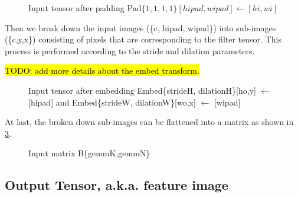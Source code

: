 {}
\begin{figure}[!h]
  \centering
  \caption{Input tensor after padding $\text{Pad}\{1,1,1,1\}[hipad,wipad] \leftarrow [hi,wi]$}
  \label{fig:input_pad_tensor}
\end{figure}

Then we break down the input images (\{c, hipad, wipad\}) into sub-images (\{c,y,x\}) consisting of pixels
that are corresponding to the filter tensor.
This process is performed according to the stride and dilation parameters.

\hl{TODO: add more details about the embed transform.}

\begin{figure}[!h]
  \centering
  \caption{Input tensor after embedding Embed\{strideH, dilationH\}[ho,y] $\leftarrow$ [hipad] and Embed\{strideW, dilationW\}[wo,x] $\leftarrow$ [wipad]}
  \label{fig:input_embed_tensor}
\end{figure}


At last, the broken down sub-images can be flattened into a matrix as shown in
\Fig \ref{fig:input_matrix_B}.
{}
\begin{figure}[!h]
  \centering
  \caption{Input matrix B\{gemmK,gemmN\}}
  \label{fig:input_matrix_B}
\end{figure}


\subsection{Output Tensor, a.k.a.  feature image}

